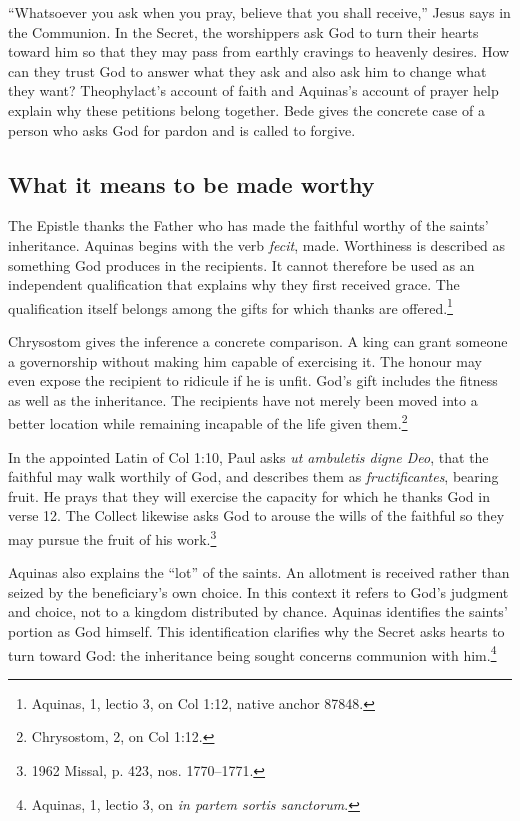 
``Whatsoever you ask when you pray, believe that you shall receive,''
Jesus says in the Communion. In the Secret, the worshippers ask God
to turn their hearts toward him so that they may pass from earthly
cravings to heavenly desires. How can they trust God to answer what
they ask and also ask him to change what they want? Theophylact's
account of faith and Aquinas's account of prayer help explain why these
petitions belong together. Bede gives the concrete case of a person
who asks God for pardon and is called to forgive.

\subsection{What it means to be made worthy}

The Epistle thanks the Father who has made the faithful worthy
of the saints' inheritance. Aquinas begins with the verb
\textit{fecit}, made. Worthiness is described as something
God produces in the recipients. It cannot therefore be used
as an independent qualification that explains why they first
received grace. The qualification itself belongs among the
gifts for which thanks are offered.\footnote{Aquinas,
 1, lectio 3, on Col 1:12,
native anchor 87848.}

Chrysostom gives the inference a concrete comparison. A king
can grant someone a governorship without making him capable
of exercising it. The honour may even expose the recipient
to ridicule if he is unfit. God's gift includes the fitness
as well as the inheritance. The recipients have not merely
been moved into a better location while remaining incapable
of the life given them.\footnote{Chrysostom,
 2, on Col 1:12.}

In the appointed Latin of Col 1:10, Paul asks
\textit{ut ambuletis digne Deo}, that the faithful may walk
worthily of God, and describes them as \textit{fructificantes},
bearing fruit. He prays that they will exercise the capacity for which
he thanks God in verse 12. The Collect likewise asks God to
arouse the wills of the faithful so they may pursue the fruit
of his work.\footnote{1962 Missal, p. 423, nos. 1770--1771.}

Aquinas also explains the ``lot'' of the saints. An allotment
is received rather than seized by the beneficiary's own
choice. In this context it refers to God's judgment and
choice, not to a kingdom distributed by chance. Aquinas
identifies the saints' portion as God himself. This
identification clarifies why the Secret asks hearts to turn
toward God: the inheritance being sought concerns communion
with him.\footnote{Aquinas,  1,
lectio 3, on \textit{in partem sortis sanctorum}.}

